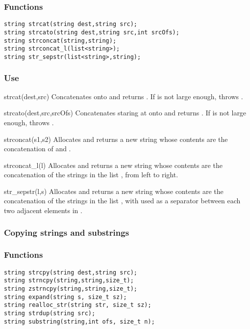 \subsubsection*{Functions}
\begin{verbatim}
string strcat(string dest,string src);
string strcato(string dest,string src,int srcOfs);
string strconcat(string,string);
string strconcat_l(list<string>);
string str_sepstr(list<string>,string);
\end{verbatim}

\subsubsection*{Use}

\begin{defun}{strcat}{(dest,src)}
Concatenates  onto  and returns .  If
 is not large enough,  throws
.
\end{defun}

\begin{defun}{strcato}{(dest,src,srcOfs)}
Concatenates  staring at  onto  and
returns .  If  is not large enough, 
throws .
\end{defun}

\begin{defun}{strconcat}{(s1,s2)}
Allocates and returns a new string whose contents are the concatenation
of  and .
\end{defun}

\begin{defun}{strconcat_l}{(l)}
Allocates and returns a new string whose contents are the concatenation
of the strings in the list , from left to right.
\end{defun}

\begin{defun}{str_sepstr}{(l,s)}
Allocates and returns a new string whose contents are the concatenation
of the strings in the list , with  used as a separator
between each two adjacent elements in .
\end{defun}

\subsubsection*{Copying strings and substrings}
\subsubsection*{Functions}
\begin{verbatim}
string strcpy(string dest,string src); 
string strncpy(string,string,size_t);
string zstrncpy(string,string,size_t);
string expand(string s, size_t sz);
string realloc_str(string str, size_t sz);
string strdup(string src);
string substring(string,int ofs, size_t n);
\end{verbatim}

